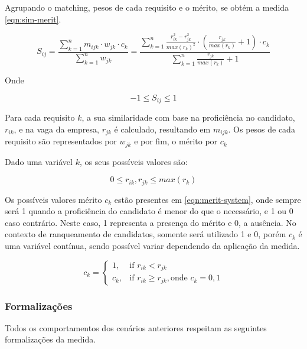 \documentclass[preprint,12pt]{elsarticle}
\begin{document}
Agrupando o matching, pesos de cada requisito e o mérito, se obtém a medida \ref{eqn:sim-merit}.

\begin{equation}
\label{eqn:sim-merit}
S_{ij} =  \frac{\sum_{k=1}^n m_{ijk} \cdot w_{jk} \cdot c_k}
               {\sum_{k=1}^n w_{jk}} =
          \frac{\sum_{k=1}^n \frac{r_{ik}^2 - r_{jk}^2}{max(r_k)^2} \cdot (\frac{r_{jk}}{max(r_k)} + 1) \cdot c_{k}}
               {\sum_{k=1}^n {\frac{r_{jk}}{max(r_k)} + 1}}
\end{equation}

Onde

\begin{equation}
-1 \leq S_{ij} \leq 1
\end{equation}

Para cada requisito $k$, a sua similaridade com base na proficiência no candidato, $r_{ik}$, e na vaga da empresa, $r_{jk}$ é calculado, resultando em $m_{ijk}$. Os pesos de cada requisito são representados por $w_{jk}$ e por fim, o mérito por $c_k$

Dado uma variável $k$, os seus possíveis valores são:

\begin{equation}
0 \leq r_{ik}, r_{jk} \leq max(r_k)
\end{equation}

Os possíveis valores mérito $c_{k}$ estão presentes em \ref{eqn:merit-system}, onde sempre será 1 quando a proficiência do candidato é menor do que o necessário, e 1 ou 0 caso contrário. Neste caso, 1 representa a presença do mérito e 0, a ausência. No contexto de ranqueamento de candidatos, somente será utilizado 1 e 0, porém $c_{k}$ é uma variável contínua, sendo possível variar dependendo da aplicação da medida.

\begin{equation}
\label{eqn:merit-system}
c_{k} = \begin{cases} 1, & \text{if } r_{ik} < r_{jk} \\ c_{k}, & \text{if } r_{ik} \geq r_{jk}, \text{onde } c_k = 0, 1 \end{cases}
\end{equation}

\subsubsection{Formalizações}

Todos os comportamentos dos cenários anteriores respeitam as seguintes formalizações da medida.
\end{document}
